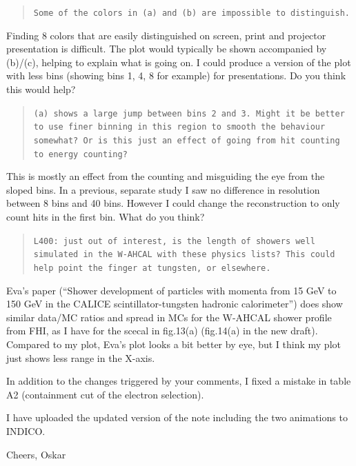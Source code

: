 \documentclass[twoside,a4paper,12pt]{article}
\begin{document}
\begin{quote}\texttt{Some of the colors in (a) and (b) are impossible to distinguish.}\end{quote}
Finding 8 colors that are easily distinguished on screen, print and projector presentation is difficult. The plot would typically be shown accompanied by (b)/(c), helping to explain what is going on. I could produce a version of the plot with less bins (showing bins 1, 4, 8 for example) for presentations. Do you think this would help? 

\begin{quote}\texttt{(a) shows a large jump between bins 2 and 3. 
Might it be better to use finer binning in this region to smooth the behaviour somewhat?
Or is this just an effect of going from hit counting to energy counting?}\end{quote}
This is mostly an effect from the counting and misguiding the eye from the sloped bins. In a previous, separate study I saw no difference in resolution between 8 bins and 40 bins. However I could change the reconstruction to only count hits in the first bin. What do you think?

\begin{quote}\texttt{L400: just out of interest, is the length of showers well simulated in the W-AHCAL with these physics lists?
This could help point the finger at tungsten, or elsewhere.}\end{quote}
Eva's paper (``Shower development of particles with momenta from 15 GeV to 150 GeV in the CALICE scintillator-tungsten hadronic calorimeter'') does show similar data/MC ratios and spread in MCs for the W-AHCAL shower profile from FHI, as I have for the scecal in fig.13(a) (fig.14(a) in the new draft). Compared to my plot, Eva's plot looks a bit better by eye, but I think my plot just shows less range in the X-axis.

In addition to the changes triggered by your comments, I fixed a mistake in table A2 (containment cut of the electron selection).

I have uploaded the updated version of the note including the two animations to INDICO.

Cheers,
Oskar
\end{document}
